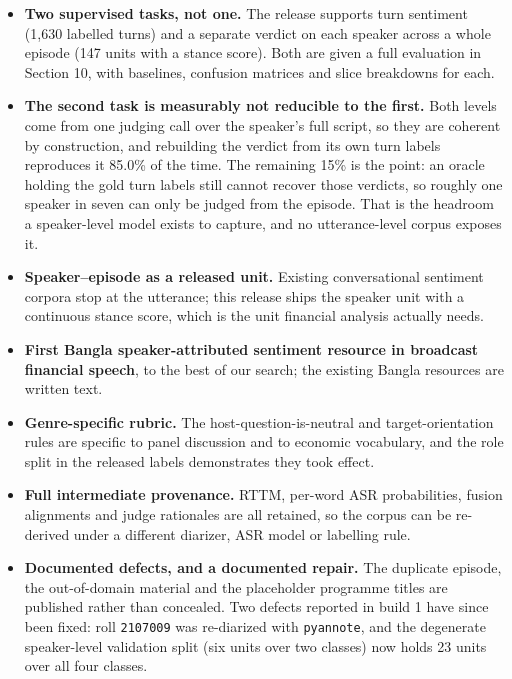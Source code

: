 \documentclass[11pt,a4paper]{article}
\begin{document}
\begin{itemize}[leftmargin=1.4em,itemsep=2pt,topsep=2pt]
  \item \textbf{Two supervised tasks, not one.} The release supports turn sentiment (1{,}630
        labelled turns) and a separate verdict on each speaker across a whole episode (147 units
        with a stance score). Both are given a full evaluation in Section 10, with baselines,
        confusion matrices and slice breakdowns for each.
  \item \textbf{The second task is measurably not reducible to the first.} Both levels come from
        one judging call over the speaker's full script, so they are coherent by construction, and
        rebuilding the verdict from its own turn labels reproduces it 85.0\% of the time. The
        remaining 15\% is the point: an oracle holding the gold turn labels still cannot recover
        those verdicts, so roughly one speaker in seven can only be judged from the episode. That
        is the headroom a speaker-level model exists to capture, and no utterance-level corpus
        exposes it.
  \item \textbf{Speaker--episode as a released unit.} Existing conversational sentiment corpora stop
        at the utterance; this release ships the speaker unit with a continuous stance
        score, which is the unit financial analysis actually needs.
  \item \textbf{First Bangla speaker-attributed sentiment resource in broadcast financial speech},
        to the best of our search; the existing Bangla resources are written text.
  \item \textbf{Genre-specific rubric.} The host-question-is-neutral and target-orientation rules
        are specific to panel discussion and to economic vocabulary, and the role split in the
        released labels demonstrates they took effect.
  \item \textbf{Full intermediate provenance.} RTTM, per-word ASR probabilities, fusion alignments
        and judge rationales are all retained, so the corpus can be re-derived under a different
        diarizer, ASR model or labelling rule.
  \item \textbf{Documented defects, and a documented repair.} The duplicate episode, the
        out-of-domain material and the placeholder programme titles are published rather than
        concealed. Two defects reported in build 1 have since been fixed: roll \texttt{2107009}
        was re-diarized with \texttt{pyannote}, and the degenerate speaker-level validation split
        (six units over two classes) now holds 23 units over all four classes.
\end{itemize}
\end{document}
